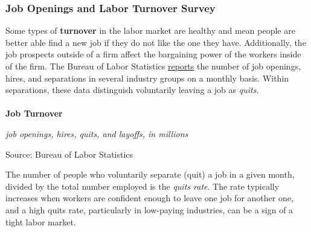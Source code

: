 \documentclass{report}
\makeatletter
\newcommand{\tbllink}[1]{\href{https://raw.githubusercontent.com/bdecon/US-chartbook/master/chartbook/data/#1}{\faTable}}
\newcommand*\short[1]{\expandafter\@gobbletwo\number\numexpr#1\relax}
\newcommand{\stdnode}[3]{\node[below, align=left, shift=({#1,#2})]{#3};}
\newcommand{\dateaxisticks}{
		date coordinates in=x, axis line style={draw=none},
		xmax={2020-08-10},
		max space between ticks=40,	    
		xtick={{1990-01-01}, {1992-01-01}, {1994-01-01}, 
			{1996-01-01}, {1998-01-01}, {2000-01-01}, 
			{2002-01-01}, {2004-01-01}, {2006-01-01},
			{2008-01-01}, {2010-01-01}, {2012-01-01}, {2014-01-01},
		    {2016-01-01}, {2018-01-01}, {2020-01-01}},
		minor xtick={{1989-01-01}, {1991-01-01}, {1993-01-01},
			{1995-01-01}, {1997-01-01}, {1999-01-01}, 
			{2001-01-01}, {2003-01-01}, {2005-01-01}, {2007-01-01},
		    {2009-01-01}, {2011-01-01}, {2013-01-01}, {2015-01-01},
		    {2017-01-01}, {2019-01-01}},
		enlarge y limits={0.06}, enlarge x limits={0.01},
		}
\newcommand{\bbar}[2]{extra #1 ticks = {{#2}}, extra #1 tick labels = ,
		extra #1 tick style = {grid=major, grid style={thick, black!25}},}
\newcommand{\stdline}[4]{\addplot[very thick, no markers, color=#1] 
		table [x=#2, y=#3, col sep=comma] {#4};	}
\newcommand{\rbars}{
		\fill[color=black!10] (axis cs:{1990-07-01},\pgfkeysvalueof{/pgfplots/ymin}) rectangle 
			(axis cs:{1991-03-01}, \pgfkeysvalueof{/pgfplots/ymax});
		\fill[color=black!10] (axis cs:{2007-12-01},\pgfkeysvalueof{/pgfplots/ymin}) rectangle 
			(axis cs:{2009-07-01}, \pgfkeysvalueof{/pgfplots/ymax});
		\fill[color=black!10] (axis cs:{2001-03-01},\pgfkeysvalueof{/pgfplots/ymin}) rectangle 
			(axis cs:{2001-11-01}, \pgfkeysvalueof{/pgfplots/ymax});
		\fill[color=black!10] (axis cs:{2020-02-01},\pgfkeysvalueof{/pgfplots/ymin}) rectangle 
			(axis cs:{2020-09-01}, \pgfkeysvalueof{/pgfplots/ymax});}
\makeatother
\begin{document}
{{{{{{{{{\newpage

\subsubsection*{\color{black!70} \seriffont Job Openings and Labor Turnover Survey}
\begin{minipage}{0.76\textwidth}
\small Some types of \textbf{turnover} in the labor market are healthy and mean people are better able find a new job if they do not like the one they have. Additionally, the job prospects outside of a firm affect the bargaining power of the workers inside of the firm. The Bureau of Labor Statistics \href{https://www.bls.gov/news.release/pdf/jolts.pdf}{reports} the number of job openings, hires, and separations in several industry groups on a monthly basis. Within separations, these data distinguish voluntarily leaving a job as \textit{quits}. \\

\small \\

\normalsize \textbf{Job Turnover}

\footnotesize{\textit{job openings, hires, quits, and layoffs, in millions}}

\hspace*{-2mm} 

\footnotesize{Source: Bureau of Labor Statistics} \hfill \tbllink{jolts.csv} 

\vspace{3mm}

\small The number of people who voluntarily separate (quit) a job in a given month, divided by the total number employed is the \textit{quits rate}. The rate typically increases when workers are confident enough to leave one job for another one, and a high quits rate, particularly in low-paying industries, can be a sign of a tight labor market.
\end{minipage}
\vspace{1mm}

}}}}}}}}}
\end{document}
